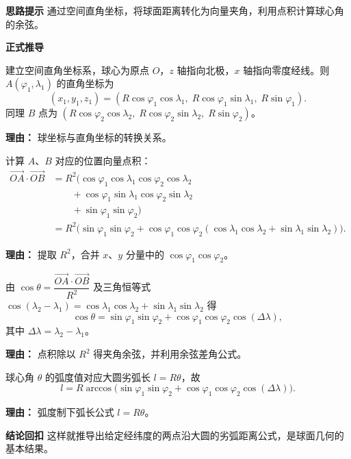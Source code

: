 \begin{proofbox}
	\textbf{\textcolor{CProof}{思路提示}}
	通过空间直角坐标，将球面距离转化为向量夹角，利用点积计算球心角的余弦。

	\medskip
	\textbf{\textcolor{CProof}{正式推导}}
	\begin{description}[style=nextline, leftmargin=2.8em, labelsep=0.5em, itemsep=0.55em]
		\item[\textbf{步骤一（坐标表示）：}]
			建立空间直角坐标系，球心为原点 $O$，$z$ 轴指向北极，$x$ 轴指向零度经线。则 $A(\varphi_1,\lambda_1)$ 的直角坐标为
			\[
				(x_1,y_1,z_1) = (R\cos\varphi_1\cos\lambda_1,\; R\cos\varphi_1\sin\lambda_1,\; R\sin\varphi_1).
			\]
			同理 $B$ 点为 $(R\cos\varphi_2\cos\lambda_2,\; R\cos\varphi_2\sin\lambda_2,\; R\sin\varphi_2)$。
			\par\textbf{理由：} 球坐标与直角坐标的转换关系。
		\item[\textbf{步骤二（向量点积）：}]
			计算 $A$、$B$ 对应的位置向量点积：
			\[
				\begin{aligned}
					\overrightarrow{OA}\cdot\overrightarrow{OB}
					&= R^2\bigl( \cos\varphi_1\cos\lambda_1\cos\varphi_2\cos\lambda_2\\
					&\qquad + \cos\varphi_1\sin\lambda_1\cos\varphi_2\sin\lambda_2\\
					&\qquad + \sin\varphi_1\sin\varphi_2 \bigr)\\
					&= R^2\bigl( \sin\varphi_1\sin\varphi_2 + \cos\varphi_1\cos\varphi_2(\cos\lambda_1\cos\lambda_2+\sin\lambda_1\sin\lambda_2) \bigr).
			\end{aligned}
			\]
			\par\textbf{理由：} 提取 $R^2$，合并 $x$、$y$ 分量中的 $\cos\varphi_1\cos\varphi_2$。
		\item[\textbf{步骤三（球心角余弦）：}]
			由 $\cos\theta = \dfrac{\overrightarrow{OA}\cdot\overrightarrow{OB}}{R^2}$ 及三角恒等式 $\cos(\lambda_2-\lambda_1)=\cos\lambda_1\cos\lambda_2+\sin\lambda_1\sin\lambda_2$ 得
			\[
				\cos\theta = \sin\varphi_1\sin\varphi_2 + \cos\varphi_1\cos\varphi_2\cos(\Delta\lambda),
			\]
			其中 $\Delta\lambda = \lambda_2-\lambda_1$。
			\par\textbf{理由：} 点积除以 $R^2$ 得夹角余弦，并利用余弦差角公式。
		\item[\textbf{步骤四（弧长公式）：}]
			球心角 $\theta$ 的弧度值对应大圆劣弧长 $l = R\theta$，故
			\[
				l = R\arccos\!\bigl( \sin\varphi_1\sin\varphi_2 + \cos\varphi_1\cos\varphi_2\cos(\Delta\lambda) \bigr).
			\]
			\par\textbf{理由：} 弧度制下弧长公式 $l = R\theta$。
	\end{description}

	\medskip
	\textbf{\textcolor{CProof}{结论回扣}}
	这样就推导出给定经纬度的两点沿大圆的劣弧距离公式，是球面几何的基本结果。
\end{proofbox}
